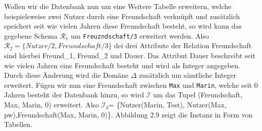 Wollen wir die Datenbank nun um eine Weitere Tabelle erweitern, welche beispielsweise zwei Nutzer durch eine Freundschaft verknüpft und zusätzlich speichert seit wie vielen Jahren diese Freundschaft besteht, so wird kann das gegebene Schema $\mathcal{R}_1$ um \texttt{Freuzndschaft/3} erweitert werden. Also $\mathcal{R}_2=\{Nutzer/2, Freundschaft/3\}$ dei drei Attribute der Relation Freundschaft sind hierbei Freund\_1, Freund\_2 und Dauer. Das Attribut Dauer beschreibt seit wie vielen Jahren eine Freundschaft besteht und wird als Integer angegeben. Durch diese Änderung wird die Domäne ${\Delta}$ zusätzlich um sämtliche Integer erweitert. 
Fügen wir nun eine Freundschaft zwischen \texttt{Max} und \texttt{Marin}, welche seit 0 Jahren besteht der Datenbank hinzu, so wird  $\mathcal{I}$ um das Tupel (Freundschaft, Max, Marin, 0) erweitert. Also $\mathcal{I}_3$= \{Nutzer(Marin, Test), Nutzer(Max, pw),Freundschaft(Max, Marin, 0)\}. Abbildung 2.9 zeigt die Instanz in Form von Tabellen.


